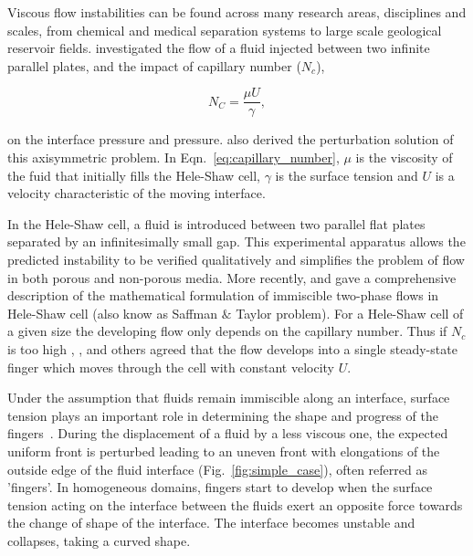 \documentclass[preprint,authoryear,12pt]{elsarticle}
\begin{document}
\medskip
Viscous flow instabilities can be found across many research areas, disciplines and scales, from chemical and medical separation systems to large scale geological reservoir fields. \citet{muskat_1934} investigated the flow of a fluid injected between two infinite parallel plates, and the impact of capillary number ($N_{c}$),

\begin{equation}
N_{C} = \frac{\mu U}{\gamma},
\label{eq:capillary_number}
\end{equation}

\noindent on the interface pressure and pressure. \citet{muskat_1934} also derived the perturbation solution of this axisymmetric problem. In Eqn.~\ref{eq:capillary_number}, $\mu$ is the viscosity of the fuid that initially fills the Hele-Shaw cell, $\gamma$ is the surface tension and $U$ is a velocity characteristic of the moving interface.

\medskip
In the Hele-Shaw cell, a fluid is introduced between two parallel flat plates separated by an infinitesimally small gap. This experimental apparatus allows the predicted instability to be verified qualitatively and simplifies the problem of flow in both porous and non-porous media.   
More recently, \citet{howison_2000} and \citet{praud_2005} gave a comprehensive description of the mathematical formulation of immiscible two-phase flows in Hele-Shaw cell (also know as Saffman $\&$ Taylor problem). For a Hele-Shaw cell of a given size the developing flow only depends on the capillary number. Thus if \textit{$N_{c}$} is too high \citet{saffman_1959}, \citet{homsy_1987}, \citet{tabeling_1987} and others agreed that the flow develops into a single steady-state finger which moves through the cell with constant velocity $U$.

\medskip
 Under the assumption that fluids remain immiscible along an interface, surface tension plays an important role in determining the shape and progress of the fingers~\citep{howison_2000}. During the displacement of a fluid by a less viscous one, the expected uniform front is perturbed %
leading to an uneven front with elongations of the outside edge of the fluid interface (Fig.~\ref{fig:simple_case}), often referred as 'fingers'. In homogeneous domains, fingers start to develop when the surface tension acting on the interface between the fluids exert an opposite force towards the change of shape of the interface. The interface becomes unstable and collapses, taking a curved shape. 
\end{document}
